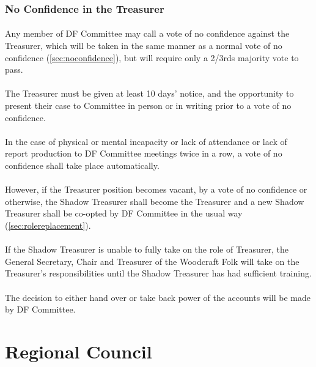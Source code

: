 \documentclass[a4paper, 12pt]{report}
\begin{document}
\subsubsection{No Confidence in the Treasurer}
\label{sec:treasurernoconfidence}
\paragraph{} Any member of DF Committee may call a vote of no confidence against the Treasurer, which will be taken in the same manner as a normal vote of no confidence (\ref{sec:noconfidence}), but will require only a 2/3rds majority vote to pass.
\paragraph{} The Treasurer must be given at least 10 days' notice, and the opportunity to present their case to Committee in person or in writing prior to a vote of no confidence.
\paragraph{} In the case of physical or mental incapacity or lack of attendance or lack of report production to DF Committee meetings twice in a row, a vote of no confidence shall take place automatically.
\paragraph{} However, if the Treasurer position becomes vacant, by a vote of no confidence or otherwise, the Shadow Treasurer shall become the Treasurer and a new Shadow Treasurer shall be co-opted by DF Committee in the usual way (\ref{sec:rolereplacement}).
\paragraph{} If the Shadow Treasurer is unable to fully take on the role of Treasurer, the General Secretary, Chair and Treasurer of the Woodcraft Folk will take on the Treasurer's responsibilities until the Shadow Treasurer has had sufficient training.
\paragraph{} The decision to either hand over or take back power of the accounts will be made by DF Committee.

\section{Regional Council}
\end{document}
